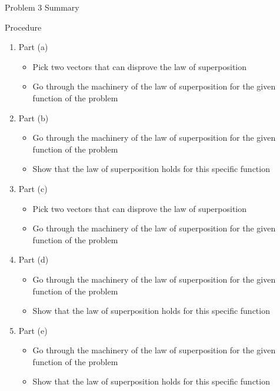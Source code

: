 \begin{summary}{Problem 3 Summary}
    \begin{statement}{Procedure}
        \begin{enumerate}[label = (\alph*)]
            \item Part (a)
            \begin{itemize}
                \item Pick two vectors that can disprove the law of superposition
                \item Go through the machinery of the law of superposition for the given function of the problem
            \end{itemize}
            \item Part (b)
            \begin{itemize}
                \item Go through the machinery of the law of superposition for the given function of the problem
                \item Show that the law of superposition holds for this specific function
            \end{itemize}
            \item Part (c)
            \begin{itemize}
                \item Pick two vectors that can disprove the law of superposition
                \item Go through the machinery of the law of superposition for the given function of the problem
            \end{itemize}
            \item Part (d)
            \begin{itemize}
                \item Go through the machinery of the law of superposition for the given function of the problem
                \item Show that the law of superposition holds for this specific function
            \end{itemize}
            \item Part (e)
            \begin{itemize}
                \item Go through the machinery of the law of superposition for the given function of the problem
                \item Show that the law of superposition holds for this specific function
            \end{itemize}

\end{enumerate}
\end{statement}
\end{summary}

